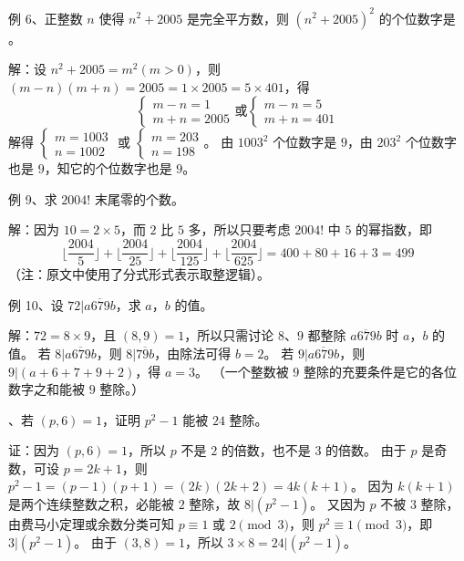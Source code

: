 \begin{questions}
    \question 例 6、正整数 $n$ 使得 $n^2 + 2005$ 是完全平方数，则 $(n^2 + 2005)^2$ 的个位数字是 \underline{\hspace{1cm}}。

\begin{solution}
解：设 $n^2 + 2005 = m^2 (m > 0)$，则 $(m - n)(m + n) = 2005 = 1 \times 2005 = 5 \times 401$，得
\[ \begin{cases} m - n = 1 \\ m + n = 2005 \end{cases} \text{或} \begin{cases} m - n = 5 \\ m + n = 401 \end{cases} \]
解得 $\begin{cases} m = 1003 \\ n = 1002 \end{cases}$ 或 $\begin{cases} m = 203 \\ n = 198 \end{cases}$。
由 $1003^2$ 个位数字是 $9$，由 $203^2$ 个位数字也是 $9$，知它的个位数字也是 $9$。
\end{solution}

\question 例 9、求 $2004!$ 末尾零的个数。

\begin{solution}
解：因为 $10 = 2 \times 5$，而 $2$ 比 $5$ 多，所以只要考虑 $2004!$ 中 $5$ 的幂指数，即
\[ \lfloor \frac{2004}{5} \rfloor + \lfloor \frac{2004}{25} \rfloor + \lfloor \frac{2004}{125} \rfloor + \lfloor \frac{2004}{625} \rfloor = 400 + 80 + 16 + 3 = 499 \]
（注：原文中使用了分式形式表示取整逻辑）。
\end{solution}

\question 例 10、设 $72 | \overline{a679b}$，求 $a$，$b$ 的值。

\begin{solution}
解：$72 = 8 \times 9$，且 $(8, 9) = 1$，所以只需讨论 $8$、$9$ 都整除 $\overline{a679b}$ 时 $a$，$b$ 的值。
若 $8 | \overline{a679b}$，则 $8 | \overline{79b}$，由除法可得 $b = 2$。
若 $9 | \overline{a679b}$，则 $9 | (a + 6 + 7 + 9 + 2)$，得 $a = 3$。
（一个整数被 $9$ 整除的充要条件是它的各位数字之和能被 $9$ 整除。）
\end{solution}

、若 $(p, 6) = 1$，证明 $p^2 - 1$ 能被 $24$ 整除。

\begin{solution}
证：因为 $(p, 6) = 1$，所以 $p$ 不是 $2$ 的倍数，也不是 $3$ 的倍数。
由于 $p$ 是奇数，可设 $p = 2k + 1$，则 $p^2 - 1 = (p - 1)(p + 1) = (2k)(2k + 2) = 4k(k + 1)$。
因为 $k(k + 1)$ 是两个连续整数之积，必能被 $2$ 整除，故 $8 | (p^2 - 1)$。
又因为 $p$ 不被 $3$ 整除，由费马小定理或余数分类可知 $p \equiv 1$ 或 $2 \pmod 3$，则 $p^2 \equiv 1 \pmod 3$，即 $3 | (p^2 - 1)$。
由于 $(3, 8) = 1$，所以 $3 \times 8 = 24 | (p^2 - 1)$。
\end{solution}


\end{questions}
